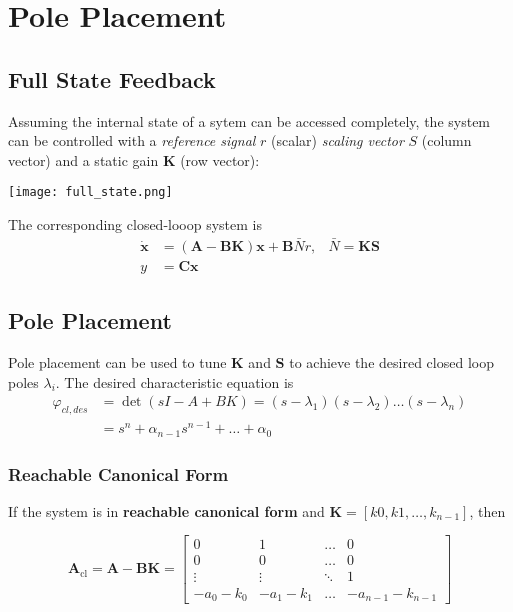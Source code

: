 \section{Pole Placement}

\subsection{Full State Feedback}
Assuming the internal state of a sytem can be accessed completely, the system can be controlled
with a \textit{reference signal} $r$ (scalar) \textit{scaling vector} $S$ (column vector) and a static gain $\mathbf{K}$ (row vector):
\begin{center}
    \texttt{[image: full\_state.png]}
\end{center}
The corresponding closed-looop system is
\noindent\begin{align*}
    \dot{\mathbf{x}} & =(\mathbf{A}-\mathbf{BK})\mathbf{x}+\mathbf{B}\bar{N}r, & \bar{N}=\mathbf{KS} \\
    y                & =\mathbf{Cx}
\end{align*}

\subsection{Pole Placement}
Pole placement can be used to tune $\mathbf{K}$ and $\mathbf{S}$ to achieve the desired closed loop poles $\lambda_i$.
The desired characteristic equation is
\noindent\begin{align*}
    \varphi_{cl,des} & =\det{(sI-A+BK)}=(s-\lambda_1)(s-\lambda_2)\ldots(s-\lambda_n) \\
                     & =s^n+\alpha_{n-1}s^{n-1}+\ldots+\alpha_0
\end{align*}

\subsubsection{Reachable Canonical Form}
If the system is in \textbf{reachable canonical form} and $\mathbf{K} = \left[k0,k1,\ldots,k_{n-1}\right]$, then

    {\footnotesize
        \noindent\begin{equation*}
            \mathbf{A}_{\mathrm{cl}}=\mathbf{A-BK}=\begin{bmatrix}
                0        & 1        & \ldots & 0                \\
                0        & 0        & \ldots & 0                \\
                \vdots   & \vdots   & \ddots & 1                \\
                -a_0-k_0 & -a_1-k_1 & \ldots & -a_{n-1}-k_{n-1}
            \end{bmatrix}
        \end{equation*}
    }

